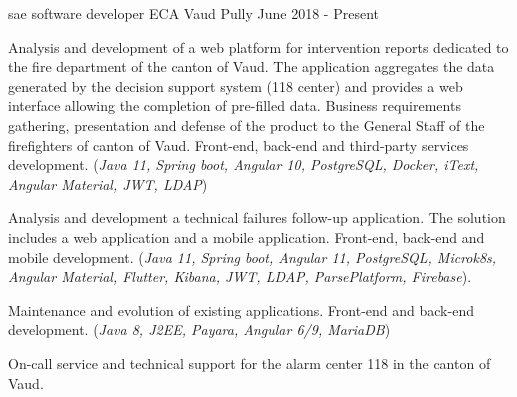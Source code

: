 


\begin{cventries}


\cventry
{sae software developer} %
{ECA Vaud} %
{Pully} %
{June 2018 - Present} %
{ %
\begin{cvitems}
\item {Analysis and development of a web platform for intervention reports dedicated to the fire department of the canton of Vaud.
The application aggregates the data generated by the decision support system (118 center) and provides a web interface allowing the completion of pre-filled data.
Business requirements gathering, presentation and defense of the product to the General Staff of the firefighters of canton of Vaud. Front-end, back-end and third-party services development.
(\emph{Java 11, Spring boot, Angular 10, PostgreSQL, Docker, iText, Angular Material, JWT, LDAP})}
\item {Analysis and development a technical failures follow-up application. The solution includes a web application and a mobile application. Front-end, back-end and mobile development.  (\emph{Java 11, Spring boot, Angular 11, PostgreSQL, Microk8s, Angular Material, Flutter, Kibana, JWT, LDAP, ParsePlatform, Firebase}).}
\item {Maintenance and evolution of existing applications. Front-end and back-end development.  (\emph{Java 8, J2EE, Payara, Angular 6/9, MariaDB})}
\item {On-call service and technical support for the alarm center 118 in the canton of Vaud.}
\end{cvitems}
}



\end{cventries}

